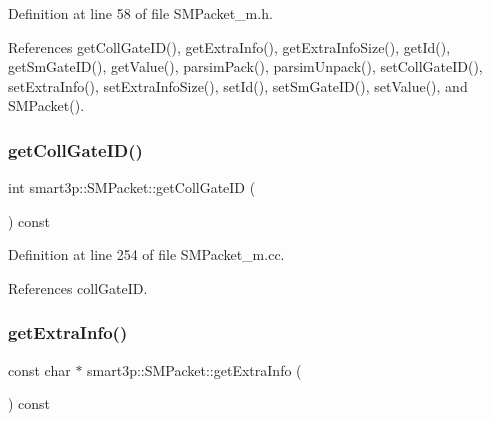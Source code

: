 Definition at line 58 of file S\+M\+Packet\+\_\+m.\+h.



References get\+Coll\+Gate\+I\+D(), get\+Extra\+Info(), get\+Extra\+Info\+Size(), get\+Id(), get\+Sm\+Gate\+I\+D(), get\+Value(), parsim\+Pack(), parsim\+Unpack(), set\+Coll\+Gate\+I\+D(), set\+Extra\+Info(), set\+Extra\+Info\+Size(), set\+Id(), set\+Sm\+Gate\+I\+D(), set\+Value(), and S\+M\+Packet().

\mbox{\label{classsmart3p_1_1SMPacket_a64547473581a84a343c77f9f4b4257c5}} 
\subsubsection{\texorpdfstring{get\+Coll\+Gate\+I\+D()}{getCollGateID()}}
{\footnotesize\ttfamily int smart3p\+::\+S\+M\+Packet\+::get\+Coll\+Gate\+ID (\begin{DoxyParamCaption}{ }\end{DoxyParamCaption}) const\hspace{0.3cm}{\ttfamily [virtual]}}



Definition at line 254 of file S\+M\+Packet\+\_\+m.\+cc.



References coll\+Gate\+ID.

\mbox{\label{classsmart3p_1_1SMPacket_a58f21f2e289fbc7910ef3e5ef7d05c3b}} 
\subsubsection{\texorpdfstring{get\+Extra\+Info()}{getExtraInfo()}}
{\footnotesize\ttfamily const char $\ast$ smart3p\+::\+S\+M\+Packet\+::get\+Extra\+Info (\begin{DoxyParamCaption}{ }\end{DoxyParamCaption}) const\hspace{0.3cm}{\ttfamily [virtual]}}



